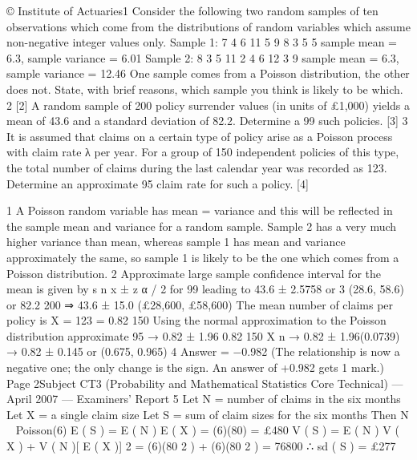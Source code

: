 © Institute of Actuaries1
Consider the following two random samples of ten observations which come from the
distributions of random variables which assume non-negative integer values only.
Sample 1: 7 4 6 11 5 9 8 3 5 5
sample mean = 6.3, sample variance = 6.01
Sample 2: 8 3 5 11 2 4 6 12 3 9
sample mean = 6.3, sample variance = 12.46
One sample comes from a Poisson distribution, the other does not.
State, with brief reasons, which sample you think is likely to be which.
2
[2]
A random sample of 200 policy surrender values (in units of £1,000) yields a mean of
43.6 and a standard deviation of 82.2.
Determine a 99%
such policies.
[3]
3
It is assumed that claims on a certain type of policy arise as a Poisson process with
claim rate λ per year.
For a group of 150 independent policies of this type, the total number of claims during
the last calendar year was recorded as 123.
Determine an approximate 95%
claim rate for such a policy.
[4]

1
A Poisson random variable has mean = variance and this will be reflected in the
sample mean and variance for a random sample.
Sample 2 has a very much higher variance than mean, whereas sample 1 has mean
and variance approximately the same, so sample 1 is likely to be the one which comes
from a Poisson distribution.
2
Approximate large sample confidence interval for the mean is given by
s
n
x ± z α / 2
for 99%
leading to 43.6 ± 2.5758
or
3
(28.6, 58.6)
or
82.2
200
⇒ 43.6 ± 15.0
(£28,600, £58,600)
The mean number of claims per policy is X =
123
= 0.82
150
Using the normal approximation to the Poisson distribution
approximate 95%
→ 0.82 ± 1.96
0.82
150
X
n
→ 0.82 ± 1.96(0.0739)
→ 0.82 ± 0.145 or (0.675, 0.965)
4
Answer = −0.982
(The relationship is now a negative one; the only change is the sign. An answer of
+0.982 gets 1 mark.)
Page 2Subject CT3 (Probability and Mathematical Statistics Core Technical) — April 2007 — Examiners’ Report
5
Let N = number of claims in the six months
Let X = a single claim size
Let S = sum of claim sizes for the six months
Then N ~ Poisson(6)
E ( S ) = E ( N ) E ( X ) = (6)(80) = £480
V ( S ) = E ( N ) V ( X ) + V ( N )[ E ( X )] 2 = (6)(80 2 ) + (6)(80 2 ) = 76800
∴ sd ( S ) = £277

